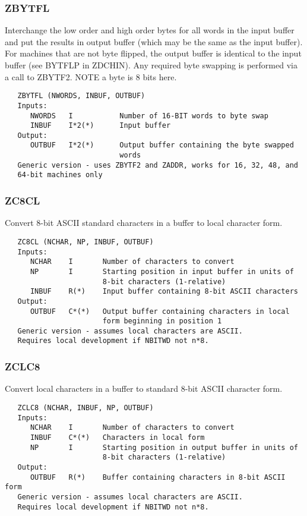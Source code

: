 \subsubsection{ZBYTFL}
Interchange the low order and high order bytes for all words in the
input buffer and put the results in output buffer (which may be the
same as the input buffer).  For machines that are not byte flipped,
the output buffer is identical to the input buffer (see BYTFLP in
ZDCHIN).  Any required byte swapping is performed via a call to
ZBYTF2.  NOTE a byte is 8 bits here.
\begin{verbatim}
   ZBYTFL (NWORDS, INBUF, OUTBUF)
   Inputs:
      NWORDS   I           Number of 16-BIT words to byte swap
      INBUF    I*2(*)      Input buffer
   Output:
      OUTBUF   I*2(*)      Output buffer containing the byte swapped
                           words
   Generic version - uses ZBYTF2 and ZADDR, works for 16, 32, 48, and
   64-bit machines only
\end{verbatim}

\subsubsection{ZC8CL}
Convert 8-bit ASCII standard characters in a buffer to local
character form.
\begin{verbatim}
   ZC8CL (NCHAR, NP, INBUF, OUTBUF)
   Inputs:
      NCHAR    I       Number of characters to convert
      NP       I       Starting position in input buffer in units of
                       8-bit characters (1-relative)
      INBUF    R(*)    Input buffer containing 8-bit ASCII characters
   Output:
      OUTBUF   C*(*)   Output buffer containing characters in local
                       form beginning in position 1
   Generic version - assumes local characters are ASCII.
   Requires local development if NBITWD not n*8.
\end{verbatim}

\subsubsection{ZCLC8}
Convert local characters in a buffer to standard 8-bit ASCII
character form.
\begin{verbatim}
   ZCLC8 (NCHAR, INBUF, NP, OUTBUF)
   Inputs:
      NCHAR    I       Number of characters to convert
      INBUF    C*(*)   Characters in local form
      NP       I       Starting position in output buffer in units of
                       8-bit characters (1-relative)
   Output:
      OUTBUF   R(*)    Buffer containing characters in 8-bit ASCII form
   Generic version - assumes local characters are ASCII.
   Requires local development if NBITWD not n*8.
\end{verbatim}

